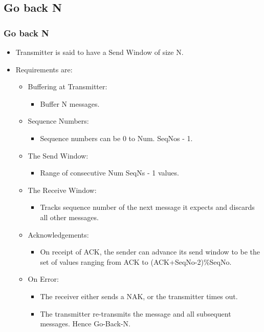 \documentclass{beamer}
\begin{document}
\subsection{Go back N}
\begin{frame}
\frametitle{Go back N}
\begin{itemize}
\item Transmitter is said to have a Send Window of size N.
\item Requirements are:
\begin{itemize}
\item Buffering at Transmitter:
\begin{itemize}
\item Buffer N messages.
\end{itemize}
\item Sequence Numbers:
\begin{itemize}
\item Sequence numbers can be 0 to Num. SeqNos - 1.
\end{itemize}
\item The Send Window:
\begin{itemize}
\item Range of consecutive Num SeqNs - 1 values.
\end{itemize}
\item The Receive Window:
\begin{itemize}
\item Tracks sequence number of the next message it expects and discards all other messages.
\end{itemize}
\item Acknowledgements:
\begin{itemize}
\item On receipt of ACK, the sender can advance its send window to be the set of values ranging from ACK to (ACK+SeqNo-2)\%SeqNo.
\end{itemize}
\item On Error:
\begin{itemize}
\item The receiver either sends a NAK, or the transmitter times out.
\item The transmitter re-transmits the message and all subsequent messages. Hence Go-Back-N.
\end{itemize}
\end{itemize}
\end{itemize}
\end{frame}
\end{document}
